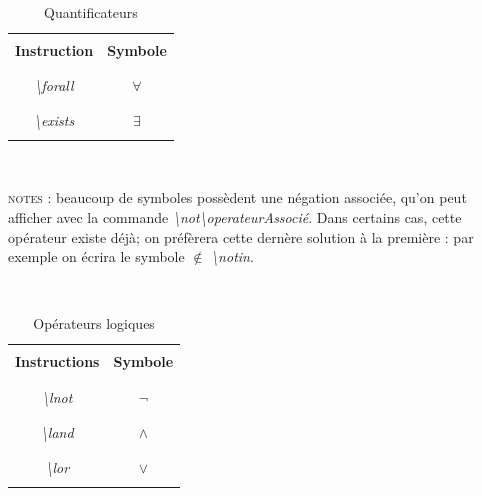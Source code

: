 \documentclass[a4paper, 10pt]{book}
\begin{document}
\pagebreak
\pagebreak

\begin{table}[t]
\caption{{Quantificateurs}}
\textit{\\}
\centering
\begin{tabular}{|c|c|}
\hline \hline  \\
\textbf{Instruction} & \textbf{Symbole} \\ \\
\hline \hline \\
\textit{\textbackslash forall} & $ \forall $ \\ \\
\hline \\
\textit{\textbackslash exists} & $ \exists $ \\ \\
\hline
\end{tabular}
\end{table}

\textit{\\}
\pagebreak

\textsc{notes :} beaucoup de symboles possèdent une négation associée, qu'on peut afficher avec la commande \textit{\textbackslash not\textbackslash operateurAssocié}. Dans certains cas, cette opérateur existe déjà; on préfèrera cette dernère solution à la première : par exemple on écrira le symbole $ \notin $ \textit{\textbackslash notin}. 

\begin{table}[ht]
\caption{Opérateurs logiques}
\textit{\\}
\centering
\begin{tabular}{|c|c|}
\hline \hline \\
\textbf{Instructions} & \textbf{Symbole} \\ \\
\hline \hline \\
\textit{\textbackslash lnot} & $ \lnot $ \\ \\
\hline \\
\textit{\textbackslash land} & $ \land $ \\ \\
\hline \\
\textit{\textbackslash lor} & $ \lor $ \\ \\
\hline 
\end{tabular}
\end{table}

\textit{\\}
\pagebreak
\end{document}
